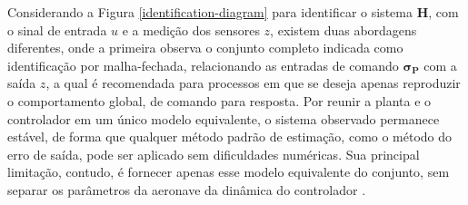 Considerando a Figura \ref{identification-diagram} para identificar o sistema $\mathbf{H}$, com o sinal de entrada $u$ e a medição dos sensores $z$, existem duas abordagens diferentes, onde a primeira observa o conjunto completo indicada como identificação por malha-fechada, relacionando as entradas de comando $\boldsymbol{\sigma_P}$ com a saída $z$, a qual é recomendada para processos em que se deseja apenas reproduzir o comportamento global, de comando para resposta. Por reunir a planta e o controlador em um único modelo equivalente, o sistema observado permanece estável, de forma que qualquer método padrão de estimação, como o método do erro de saída, pode ser aplicado sem dificuldades numéricas. Sua principal limitação, contudo, é fornecer apenas esse modelo equivalente do conjunto, sem separar os parâmetros da aeronave da dinâmica do controlador \cite{Jategaonkar2015}.

